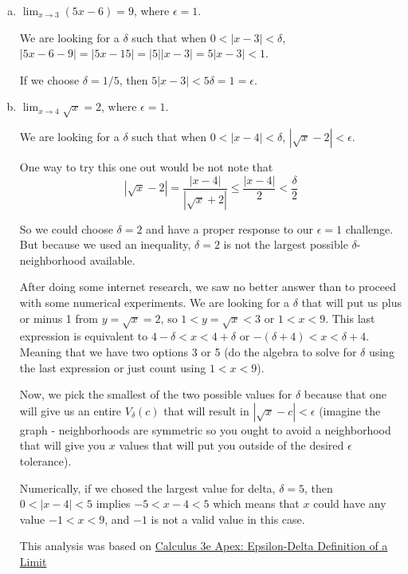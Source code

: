 \begin{enumerate}[(a)]
\item $\lim_{x\rightarrow 3} \left( 5x - 6 \right) = 9$, where $\epsilon = 1$.

We are looking for a $\delta$ such that when $0 < |x-3| < \delta$, $|5x -6 -9| = |5x- 15|= |5||x-3| = 5|x-3| < 1$.

If we choose $\delta = 1/5$, then $5|x-3| < 5\delta = 1 = \epsilon$.

\item $\lim_{x\rightarrow 4} \sqrt{x} = 2$, where $\epsilon = 1$.

We are looking for a $\delta$ such that when $0 < |x-4| < \delta$, $|\sqrt{x}-2| < \epsilon$.

One way to try this one out would be not note that
$$
|\sqrt{x}-2| = \frac{|x-4|}{|\sqrt{x}+2|} \leq \frac{|x-4|}{2} < \frac{\delta}{2}
$$

So we could choose $\delta = 2$ and have a proper response to our $\epsilon = 1$ challenge.
But because we used an inequality, $\delta = 2$ is not the largest possible $\delta$-neighborhood available.

After doing some internet research, we saw no better answer than to proceed with some numerical experiments.
We are looking for a $\delta$ that will put us plus or minus 1 from $y = \sqrt{x} = 2$, so $1 < y = \sqrt{x} < 3$
or $1 < x < 9$.
This last expression is equivalent to $4-\delta < x < 4+\delta$ or $-(\delta +4) < x < \delta + 4$.
Meaning that we have two options 3 or 5 (do the algebra to solve for $\delta$ using the last expression or just count using $1 < x < 9$).

Now, we pick the smallest of the two possible values for $\delta$ because that one will give us an entire $V_\delta (c)$ that will result
in $|\sqrt{x} - c| < \epsilon$ (imagine the graph - neighborhoods are symmetric so you ought to avoid a neighborhood that will give you $x$
values that will put you outside of the desired $\epsilon$ tolerance).

Numerically, if we chosed the largest value for delta, $\delta = 5$, then $0 < |x-4| < 5$ implies $-5 < x-4 < 5$ which means that $x$ could have any value
$-1 < x < 9$, and $-1$ is not a valid value in this case.

This analysis was based on
\href{https://math.libretexts.org/Bookshelves/Calculus/Calculus_3e_(Apex)/01%3A_Limits/1.02%3A_Epsilon-Delta_Definition_of_a_Limit}{Calculus 3e Apex: Epsilon-Delta Definition of a Limit}



\end{enumerate}
